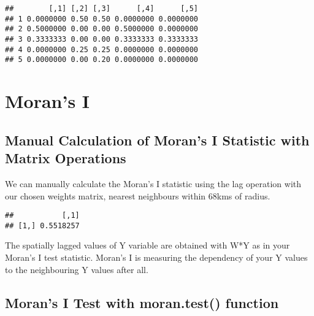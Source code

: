 \documentclass[
]{book}
\newenvironment{Shaded}{\begin{snugshade}}{\end{snugshade}}
\newcommand{\FunctionTok}[1]{\textcolor[rgb]{0.00,0.00,0.00}{#1}}
\newcommand{\NormalTok}[1]{#1}
\newcommand{\OtherTok}[1]{\textcolor[rgb]{0.56,0.35,0.01}{#1}}
\newcommand{\SpecialCharTok}[1]{\textcolor[rgb]{0.00,0.00,0.00}{#1}}
\begin{document}
\begin{verbatim}
##        [,1] [,2] [,3]      [,4]      [,5]
## 1 0.0000000 0.50 0.50 0.0000000 0.0000000
## 2 0.5000000 0.00 0.00 0.5000000 0.0000000
## 3 0.3333333 0.00 0.00 0.3333333 0.3333333
## 4 0.0000000 0.25 0.25 0.0000000 0.0000000
## 5 0.0000000 0.00 0.20 0.0000000 0.0000000
\end{verbatim}

\hypertarget{morans-i}{%
\section{Moran's I}\label{morans-i}}

\hypertarget{manual-calculation-of-morans-i-statistic-with-matrix-operations}{%
\subsection{Manual Calculation of Moran's I Statistic with Matrix Operations}\label{manual-calculation-of-morans-i-statistic-with-matrix-operations}}

We can manually calculate the Moran's I statistic using the lag operation with our chosen weights matrix, nearest neighbours within 68kms of radius.

\begin{Shaded}
\end{Shaded}

\begin{verbatim}
##           [,1]
## [1,] 0.5518257
\end{verbatim}

The spatially lagged values of Y variable are obtained with W*Y as in your Moran's I test statistic. Moran's I is measuring the dependency of your Y values to the neighbouring Y values after all.

\hypertarget{morans-i-test-with-moran.test-function}{%
\subsection{Moran's I Test with moran.test() function}\label{morans-i-test-with-moran.test-function}}
\end{document}
